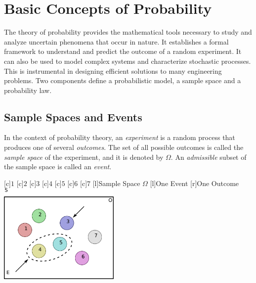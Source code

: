 \chapter[Basic Concepts]{Basic Concepts of Probability}

The theory of probability provides the mathematical tools necessary to study and analyze uncertain phenomena that occur in nature.
It establishes a formal framework to understand and predict the outcome of a random experiment.
It can also be used to model complex systems and characterize stochastic processes.
This is instrumental in designing efficient solutions to many engineering problems.
Two components define a probabilistic model, a sample space and a probability law.


\section{Sample Spaces and Events}

In the context of probability theory, an \emph{experiment} is a random process that produces one of several \emph{outcomes}.  
The set of all possible outcomes is called the \emph{sample space} of the experiment, and it is denoted by $\Omega$. 
An \emph{admissible} subset of the sample space is called an \emph{event}. 

\begin{center}
\begin{psfrags}
[c]{$1$}
[c]{$2$}
[c]{$3$}
[c]{$4$}
[c]{$5$}
[c]{$6$}
[c]{$7$}
[l]{Sample Space $\Omega$}
[l]{One Event}
[r]{One Outcome}
\includegraphics[height=4.85cm]{Figures/2Chapter/samplespace}
\end{psfrags}
\end{center}

